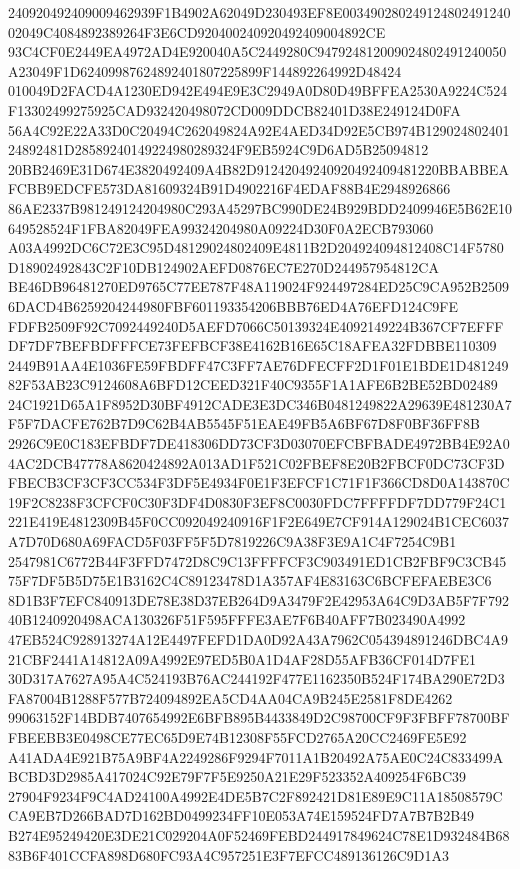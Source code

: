 \documentclass[UTF8,fontset=fandol,zihao=-4,a4paper]{ctexart}
\begin{document}
{{240920492409009462939F1B4902A62049D230493EF8E00349028024912480249124002049C4084892389264F3E6CD920400240920492409004892CE
93C4CF0E2449EA4972AD4E920040A5C2449280C947924812009024802491240050A23049F1D62409987624892401807225899F144892264992D48424
010049D2FACD4A1230ED942E494E9E3C2949A0D80D49BFFEA2530A9224C524F13302499275925CAD932420498072CD009DDCB82401D38E249124D0FA
56A4C92E22A33D0C20494C262049824A92E4AED34D92E5CB974B12902480240124892481D28589240149224980289324F9EB5924C9D6AD5B25094812
20BB2469E31D674E3820492409A4B82D91242049240920492409481220BBABBEAFCBB9EDCFE573DA81609324B91D4902216F4EDAF88B4E2948926866
86AE2337B981249124204980C293A45297BC990DE24B929BDD2409946E5B62E10649528524F1FBA82049FEA99324204980A09224D30F0A2ECB793060
A03A4992DC6C72E3C95D48129024802409E4811B2D204924094812408C14F5780D18902492843C2F10DB124902AEFD0876EC7E270D244957954812CA
BE46DB96481270ED9765C77EE787F48A119024F924497284ED25C9CA952B25096DACD4B6259204244980FBF601193354206BBB76ED4A76EFD124C9FE
FDFB2509F92C7092449240D5AEFD7066C50139324E4092149224B367CF7EFFFDF7DF7BEFBDFFFCE73FEFBCF38E4162B16E65C18AFEA32FDBBE110309
2449B91AA4E1036FE59FBDFF47C3FF7AE76DFECFF2D1F01E1BDE1D48124982F53AB23C9124608A6BFD12CEED321F40C9355F1A1AFE6B2BE52BD02489
24C1921D65A1F8952D30BF4912CADE3E3DC346B0481249822A29639E481230A7F5F7DACFE762B7D9C62B4AB5545F51EAE49FB5A6BF67D8F0BF36FF8B
2926C9E0C183EFBDF7DE418306DD73CF3D03070EFCBFBADE4972BB4E92A04AC2DCB47778A8620424892A013AD1F521C02FBEF8E20B2FBCF0DC73CF3D
FBECB3CF3CF3CC534F3DF5E4934F0E1F3EFCF1C71F1F366CD8D0A143870C19F2C8238F3CFCF0C30F3DF4D0830F3EF8C0030FDC7FFFFDF7DD779F24C1
221E419E4812309B45F0CC092049240916F1F2E649E7CF914A129024B1CEC6037A7D70D680A69FACD5F03FF5F5D7819226C9A38F3E9A1C4F7254C9B1
2547981C6772B44F3FFD7472D8C9C13FFFFCF3C903491ED1CB2FBF9C3CB4575F7DF5B5D75E1B3162C4C89123478D1A357AF4E83163C6BCFEFAEBE3C6
8D1B3F7EFC840913DE78E38D37EB264D9A3479F2E42953A64C9D3AB5F7F79240B1240920498ACA130326F51F595FFFE3AE7F6B40AFF7B023490A4992
47EB524C928913274A12E4497FEFD1DA0D92A43A7962C054394891246DBC4A921CBF2441A14812A09A4992E97ED5B0A1D4AF28D55AFB36CF014D7FE1
30D317A7627A95A4C524193B76AC244192F477E1162350B524F174BA290E72D3FA87004B1288F577B724094892EA5CD4AA04CA9B245E2581F8DE4262
99063152F14BDB7407654992E6BFB895B4433849D2C98700CF9F3FBFF78700BFFBEEBB3E0498CE77EC65D9E74B12308F55FCD2765A20CC2469FE5E92
A41ADA4E921B75A9BF4A2249286F9294F7011A1B20492A75AE0C24C833499ABCBD3D2985A417024C92E79F7F5E9250A21E29F523352A409254F6BC39
27904F9234F9C4AD24100A4992E4DE5B7C2F892421D81E89E9C11A18508579CCA9EB7D266BAD7D162BD0499234FF10E053A74E159524FD7A7B7B2B49
B274E95249420E3DE21C029204A0F52469FEBD244917849624C78E1D932484B6883B6F401CCFA898D680FC93A4C957251E3F7EFCC489136126C9D1A3
}}
\end{document}
